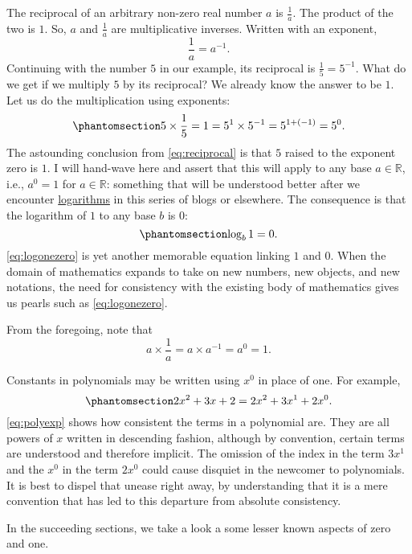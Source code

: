 \documentclass[
  a4paper,
]{article}
\begin{document}
The reciprocal of an arbitrary non-zero real number \(a\) is
\(\frac{1}{a}\). The product of the two is \(1\). So, \(a\) and
\(\frac{1}{a}\) are multiplicative inverses. Written with an exponent,
\[
\frac{1}{a} = a^{-1}.
\] Continuing with the number \(5\) in our example, its reciprocal is
\(\frac{1}{5} = 5^{-1}\). What do we get if we multiply \(5\) by its
reciprocal? We already know the answer to be \(1\). Let us do the
multiplication using exponents:
\begin{equation}\phantomsection\label{eq:reciprocal}{
5 \times \frac{1}{5} = 1 = 5^{1} \times 5^{-1} = 5^{1+(-1)} = 5^{0}.
}\end{equation} The astounding conclusion from \cref{eq:reciprocal} is
that \(5\) raised to the exponent zero is \({1}\). I will hand-wave here
and assert that this will apply to any base \(a \in \mathbb{R}\), i.e.,
\(a^0 = 1\) for \(a \in \mathbb{R}\): something that will be understood
better after we encounter
\href{https://www.britannica.com/science/logarithm}{logarithms} in this
series of blogs or elsewhere. The consequence is that the logarithm of
\(1\) to any base \(b\) is \(0\):
\begin{equation}\phantomsection\label{eq:logonezero}{
\log_{b}1 = 0.
}\end{equation} \cref{eq:logonezero} is yet another memorable equation
linking \(1\) and \(0\). When the domain of mathematics expands to take
on new numbers, new objects, and new notations, the need for consistency
with the existing body of mathematics gives us pearls such as
\cref{eq:logonezero}.

From the foregoing, note that \[
a \times \frac{1}{a} = a \times a^{-1} = a^0 = 1.
\]

Constants in polynomials may be written using \(x^0\) in place of one.
For example, \begin{equation}\phantomsection\label{eq:polyexp}{
2x^2 + 3x + 2 = 2x^2 + 3x^1 + 2x^0.
}\end{equation} \cref{eq:polyexp} shows how consistent the terms in a
polynomial are. They are all powers of \(x\) written in descending
fashion, although by convention, certain terms are understood and
therefore implicit. The omission of the index in the term \(3x^1\) and
the \(x^0\) in the term \(2x^0\) could cause disquiet in the newcomer to
polynomials. It is best to dispel that unease right away, by
understanding that it is a mere convention that has led to this
departure from absolute consistency.

In the succeeding sections, we take a look a some lesser known aspects
of zero and one.
\end{document}
